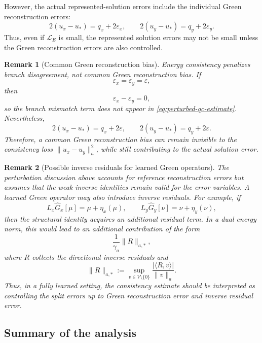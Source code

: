 \documentclass[11pt]{article}
\newtheorem{remark}{Remark}
\begin{document}
However, the actual represented-solution errors include the individual
Green reconstruction errors:
\begin{equation}
    2(u_x-u_*)=q_x+2\varepsilon_x,
    \qquad
    2(u_y-u_*)=q_y+2\varepsilon_y.
    \label{eq:solution-error-with-green-bias}
\end{equation}
Thus, even if \(\mathcal L_E\) is small, the represented solution errors
may not be small unless the Green reconstruction errors are also
controlled.

\begin{remark}[Common Green reconstruction bias]
Energy consistency penalizes branch disagreement, not common Green
reconstruction bias.  If
\[
    \varepsilon_x=\varepsilon_y=\varepsilon,
\]
then
\[
    \varepsilon_x-\varepsilon_y=0,
\]
so the branch mismatch term does not appear in
\eqref{eq:perturbed-qc-estimate}.  Nevertheless,
\[
    2(u_x-u_*)=q_x+2\varepsilon,
    \qquad
    2(u_y-u_*)=q_y+2\varepsilon.
\]
Therefore, a common Green reconstruction bias can remain invisible to
the consistency loss \( \|u_x-u_y\|_a^2 \), while still contributing to
the actual solution error.
\end{remark}

\begin{remark}[Possible inverse residuals for learned Green operators]
The perturbation discussion above accounts for reference reconstruction
errors but assumes that the weak inverse identities remain valid for the
error variables.  A learned Green operator may also introduce inverse
residuals.  For example, if
\[
    L_x\widehat G_x[\mu]
    =
    \mu+\eta_x(\mu),
    \qquad
    L_y\widehat G_y[\nu]
    =
    \nu+\eta_y(\nu),
\]
then the structural identity acquires an additional residual term.  In a
dual energy norm, this would lead to an additional contribution of the
form
\[
    \frac{1}{\gamma_a}\|R\|_{a,*},
\]
where \(R\) collects the directional inverse residuals and
\[
    \|R\|_{a,*}
    :=
    \sup_{v\in V\setminus\{0\}}
    \frac{|\langle R,v\rangle|}{\|v\|_a}.
\]
Thus, in a fully learned setting, the consistency estimate should be
interpreted as controlling the split errors up to Green reconstruction
error and inverse residual error.
\end{remark}

\subsection{Summary of the analysis}
\label{subsec:analysis-summary}
\end{document}
